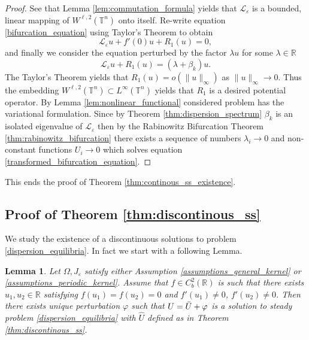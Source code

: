 \documentclass[12pt, a4paper]{article}
\theoremstyle{break}
\theoremstyle{break}
\theoremstyle{break}
\theoremstyle{break}
\newtheorem{lem}{Lemma}[section]
\theoremstyle{break}
\newcommand{\Leo}{\mathcal{L}_{\varepsilon}}
\begin{document}
\begin{proof}
    See that Lemma \ref{lem:commutation_formula} yields that $\Leo$ is a bounded, linear mapping of $W^{\ell,2}(\mathbb{T}^n)$ onto itself. Re-write equation \eqref{bifurcation_equation} using Taylor's Theorem to obtain
    \begin{equation*}
        \Leo u + f'(0) u + R_1(u) = 0,
    \end{equation*}
    and finally we consider the equation perturbed by the factor $\lambda u$ for some $\lambda \in \mathbb{R}$
    \begin{equation}
        \Leo u + R_1(u) = (\lambda + \beta_k)u.
        \label{transformed_bifurcation_equation}
    \end{equation}
    The Taylor's Theorem yields that $R_1(u) = o(\|u\|_\infty)$ as $\|u\|_\infty \rightarrow 0$. Thus the embedding $W^{\ell,2}(\mathbb{T}^n) \subset L^\infty(\mathbb{T}^n)$ yields that $R_1$ is a desired potential operator. By Lemma \ref{lem:nonlinear_functional} considered problem has the variational formulation. Since by Theorem \ref{thm:dispersion_spectrum} $\beta_k$ is an isolated eigenvalue of $\Leo$ then by the Rabinowitz Bifurcation Theorem \ref{thm:rabinowitz_bifurcation} there exists a sequence of numbers $\lambda_i \rightarrow 0$ and non-constant functions $U_i \rightarrow 0$ which solves equation \eqref{transformed_bifurcation_equation}.
\end{proof}

This ends the proof of Theorem \ref{thm:continous_ss_existence}.

\subsection{Proof of Theorem \ref{thm:discontinous_ss}}

We study the existence of a discontinuous solutions to problem \eqref{dispersion_equilibria}. In fact we start with a following Lemma.

\begin{lem}    
    Let $\Omega, J_\varepsilon$ satisfy either Assumption \ref{assumptions_general_kernel} or \ref{assumptions_periodic_kernel}. Assume that $f \in C^2_b(\mathbb{R})$ is such that there exists $u_1, u_2 \in \mathbb{R}$ satisfying $f(u_1) = f(u_2) = 0$ and $f'(u_1) \neq 0$, $f'(u_2) \neq 0$. Then there exists unique perturbation $\varphi$ such that $U = \Bar{U} + \varphi$ is a solution to steady problem \eqref{dispersion_equilibria} with $\hat{U}$ defined as in Theorem \ref{thm:discontinous_ss}.
    \label{lem:discontinuos_ss_existence}
\end{lem}
\end{document}
